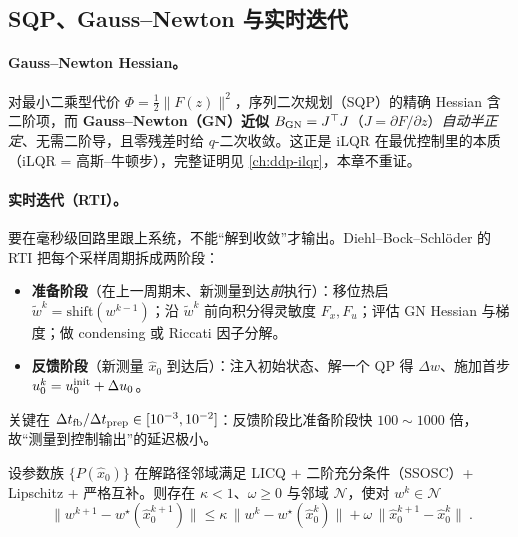 \subsection{SQP、Gauss--Newton 与实时迭代}
\label{sec:mpc-rti}
\paragraph{Gauss--Newton Hessian。}
对最小二乘型代价 $\Phi=\tfrac12\|F(z)\|^2$，序列二次规划（SQP）的精确 Hessian 含二阶项，而 \textbf{Gauss--Newton（GN）近似} $B_{\rm GN}=J^\top J$（$J=\partial F/\partial z$）\emph{自动半正定}、无需二阶导，且零残差时给 $q$-二次收敛。这正是 iLQR 在最优控制里的本质（iLQR = 高斯--牛顿步），完整证明见 \cref{ch:ddp-ilqr}，本章不重证。

\paragraph{实时迭代（RTI）。}
要在毫秒级回路里跟上系统，不能“解到收敛”才输出。Diehl--Bock--Schlöder 的 RTI 把每个采样周期拆成两阶段：

\begin{itemize}
  \item \textbf{准备阶段}（在上一周期末、新测量到达\emph{前}执行）：移位热启 $\tilde w^k=\mathrm{shift}(w^{k-1})$；沿 $\tilde w^k$ 前向积分得灵敏度 $F_x,F_u$；评估 GN Hessian 与梯度；做 condensing 或 Riccati 因子分解。
  \item \textbf{反馈阶段}（新测量 $\hat x_0$ 到达后）：注入初始状态、解一个 QP 得 $\Delta w$、施加首步 $u_0^k=u_0^{\rm init}+\Delta u_0$。
\end{itemize}
关键在 $\Delta t_{\rm fb}/\Delta t_{\rm prep}\in[10^{-3},10^{-2}]$：反馈阶段比准备阶段快 $100\sim1000$ 倍，故“测量到控制输出”的延迟极小。

\begin{theorem}
\label{thm:mpc-rti-contractivity}
设参数族 $\{P(\hat x_0)\}$ 在解路径邻域满足 LICQ + 二阶充分条件（SSOSC）+ Lipschitz + 严格互补。则存在 $\kappa<1$、$\omega\ge0$ 与邻域 $\mathcal N$，使对 $w^k\in\mathcal N$
\begin{equation}
  \boxed{\ \|w^{k+1}-w^\star(\hat x_0^{k+1})\|\le\kappa\,\|w^k-w^\star(\hat x_0^k)\|+\omega\,\|\hat x_0^{k+1}-\hat x_0^k\|\ }.
  \label{eq:mpc-rti-contractivity}
\end{equation}
\end{theorem}

